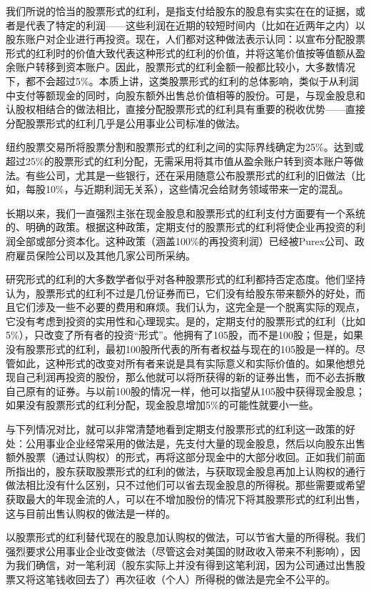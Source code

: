 \documentclass[12pt,oneside]{book}
\begin{document}
我们所说的恰当的股票形式的红利，是指支付给股东的股息有实实在在的证据，或者是代表了特定的利润——这些利润在近期的较短时间内（比如在近两年之内）以股东账户对企业进行再投资。现在，人们都对这种做法表示认同：以宣布分配股票形式的红利时的价值大致代表这种形式的红利的价值，并将这笔价值按等值额从盈余账户转移到资本账户。因此，股票形式的红利金额一般都比较小，大多数情况下，都不会超过5\%。本质上讲，这类股票形式的红利的总体影响，类似于从利润中支付等额现金的同时，向股东额外出售总价值相等的股份。可是，与现金股息和认股权相结合的做法相比，直接分配股票形式的红利具有重要的税收优势——直接分配股票形式的红利几乎是公用事业公司标准的做法。

纽约股票交易所将股票分割和股票形式的红利之间的实际界线确定为25\%。达到或超过25\%的股票形式的红利分配，无需采用将其市值从盈余账户转到资本账户等做法。有些公司，尤其是一些银行，还在采用随意公布股票形式的红利的旧做法（比如，每股10\%，与近期利润无关系），这些情况会给财务领域带来一定的混乱。

长期以来，我们一直强烈主张在现金股息和股票形式的红利支付方面要有一个系统的、明确的政策。根据这种政策，定期支付的股票形式的红利将使企业再投资的利润全部或部分资本化。这种政策（涵盖100\%的再投资利润）已经被Purex公司、政府雇员保险公司以及其他几家公司所采纳。

研究形式的红利的大多数学者似乎对各种股票形式的红利都持否定态度。他们坚持认为，股票形式的红利不过是几份证券而已，它们没有给股东带来额外的好处，而且它们涉及一些不必要的费用和麻烦。我们认为，这完全是一个脱离实际的观点，它没有考虑到投资的实用性和心理现实。是的，定期支付的股票形式的红利（比如5\%），只改变了所有者的投资“形式”。他拥有了105股，而不是100股；但是，如果没有股票形式的红利，最初100股所代表的所有者权益与现在的105股是一样的。尽管如此，这种形式的改变对所有者来说是具有实际意义和实际价值的。如果他想兑现自己利润再投资的股份，那么他就可以将所获得的新的证券出售，而不必去拆散自己原有的证券。与以前100股的情况一样，他可以指望从105股中获得现金股息；如果没有股票形式的红利分配，现金股息增加5\%的可能性就要小一些。

与下列情况对比，就可以非常清楚地看到定期支付股票形式的红利这一政策的好处：公用事业企业经常采用的做法是，先支付大量的现金股息，然后以向股东出售额外股票（通过认购权）的形式，再将这部分现金中的大部分收回。正如我们前面所指出的，股东获取股票形式的红利的做法，与获取现金股息再加上认购权的通行做法相比没有什么区别，只不过他们可以省去现金股息的所得税。那些需要或希望获取最大的年现金流的人，可以在不增加股份的情况下将其股票形式的红利出售，这与目前出售认购权的做法是一样的。

以股票形式的红利替代现在的股息加认购权的做法，可以节省大量的所得税。我们强烈要求公用事业企业改变做法（尽管这会对美国的财政收入带来不利影响），因为我们确信，对一笔利润（股东实际上并没有得到这笔利润，因为公司通过出售股票又将这笔钱收回去了）再次征收（个人）所得税的做法是完全不公平的。
\end{document}
